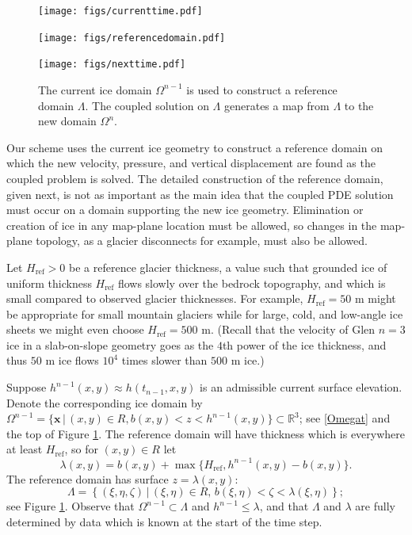 \documentclass[letterpaper,final,12pt,reqno]{amsart}
\newcommand{\RR}{\mathbb{R}}
\newcommand{\bx}{\mathbf{x}}
\newcommand{\Href}{H_{\text{ref}}}
\begin{document}
\begin{figure}[ht]
\begin{center}
\texttt{[image: figs/currenttime.pdf]}
\vspace{-6mm}

\texttt{[image: figs/referencedomain.pdf]}
\vspace{-1mm}

\texttt{[image: figs/nexttime.pdf]}
\end{center}
\caption{The current ice domain $\Omega^{n-1}$ is used to construct a reference domain $\Lambda$.  The coupled solution on $\Lambda$ generates a map from $\Lambda$ to the new domain $\Omega^n$.}
\label{fig:domainupdate}
\end{figure}

Our scheme uses the current ice geometry to construct a reference domain on which the new velocity, pressure, and vertical displacement are found as the coupled problem is solved.  The detailed construction of the reference domain, given next, is not as important as the main idea that the coupled PDE solution must occur on a domain supporting the new ice geometry.  Elimination or creation of ice in any map-plane location must be allowed, so changes in the map-plane topology, as a glacier disconnects for example, must also be allowed.

Let $\Href>0$ be a reference glacier thickness, a value such that grounded ice of uniform thickness $\Href$ flows slowly over the bedrock topography, and which is small compared to observed glacier thicknesses.  For example, $\Href=50$ m might be appropriate for small mountain glaciers while for large, cold, and low-angle ice sheets we might even choose $\Href=500$ m.  (Recall that the velocity of Glen $n=3$ ice in a slab-on-slope geometry \cite{GreveBlatter2009} goes as the $4$th power of the ice thickness, and thus $50$ m ice flows $10^4$ times slower than $500$ m ice.)

Suppose $h^{n-1}(x,y) \approx h(t_{n-1},x,y)$ is an admissible current surface elevation.  Denote the corresponding ice domain by $\Omega^{n-1}=\{\bx\,\big|\,(x,y)\in R, b(x,y)<z<h^{n-1}(x,y)\} \subset \RR^3$; see \eqref{Omegat} and the top of Figure \ref{fig:domainupdate}.  The reference domain will have thickness which is everywhere at least $\Href$, so for $(x,y) \in R$ let
\begin{equation}
\lambda(x,y) = b(x,y) + \max\{\Href,h^{n-1}(x,y)-b(x,y)\}. \label{definelambda}
\end{equation}
The reference domain has surface $z=\lambda(x,y)$:
\begin{equation}
\Lambda = \left\{(\xi,\eta,\zeta)\,\big|\,(\xi,\eta)\in R, \, b(\xi,\eta) < \zeta < \lambda(\xi,\eta)\right\};  \label{Lambda}
\end{equation}
see Figure \ref{fig:domainupdate}.  Observe that $\Omega^{n-1} \subset \Lambda$ and $h^{n-1} \le \lambda$, and that $\Lambda$ and $\lambda$ are fully determined by data which is known at the start of the time step.
\end{document}
